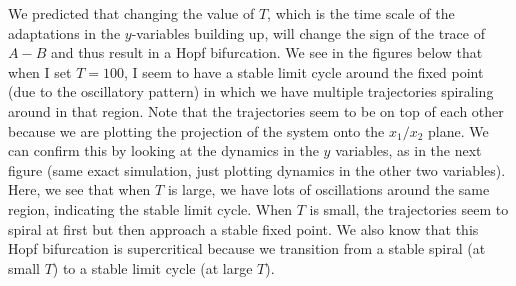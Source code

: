 \documentclass[11pt]{article}
\begin{document}
We predicted that changing the value of $T$, which is the time scale of the adaptations in the $y$-variables building up, will change the sign of the trace of $A-B$ and thus result in a Hopf bifurcation. We see in the figures below that when I set $T = 100$, I seem to have a stable limit cycle around the fixed point (due to the oscillatory pattern) in which we have multiple trajectories spiraling around in that region. Note that the trajectories seem to be on top of each other because we are plotting the projection of the system onto the $x_1/x_2$ plane. We can confirm this by looking at the dynamics in the $y$ variables, as in the next figure (same exact simulation, just plotting dynamics in the other two variables). Here, we see that when $T$ is large, we have lots of oscillations around the same region, indicating the stable limit cycle. When $T$ is small, the trajectories seem to spiral at first but then approach a stable fixed point. We also know that this Hopf bifurcation is supercritical because we transition from a stable spiral (at small $T$) to a stable limit cycle (at large $T$).
\end{document}
